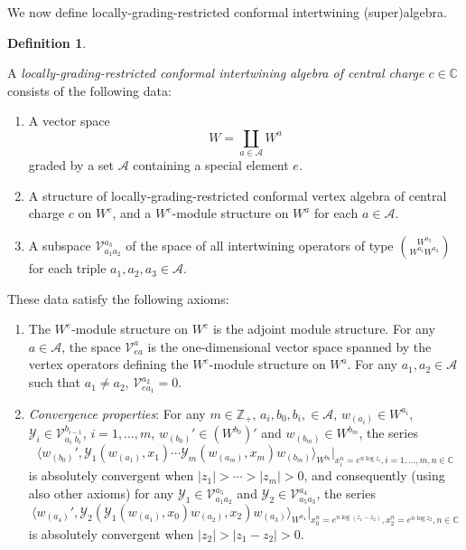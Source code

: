 \documentclass{amsproc}
\theoremstyle{definition}
\newtheorem{defn}[thm]{Definition}
\theoremstyle{remark}
\numberwithin{equation}{section}
\begin{document}
We now define locally-grading-restricted conformal
intertwining (super)algebra.


\begin{defn}\label{ioa}
{\rm A {\it locally-grading-restricted conformal
intertwining algebra of central charge 
$c\in \mathbb{C}$} consists of the following data:

\begin{enumerate}

\item A vector space
$$W=\coprod_{a\in
\mathcal{A}}W^{a}$$
graded
by a set $\mathcal{A}$
containing a special element $e$.

\item A structure of locally-grading-restricted conformal vertex algebra
 of central charge $c$ 
on $W^{e}$, and a $W^{e}$-module 
structure on $W^{a}$ for 
each $a\in \mathcal{A}$.

\item A subspace $\mathcal{V}_{a_{1}a_{2}}^{a_{3}}$ of 
the space of all intertwining operators of type 
$\binom{W^{a_{3}}}{W^{a_{1}}W^{a_{2}}}$ for  each triple
$a_{1}, a_{2}, a_{3}\in \mathcal{A}$.


\end{enumerate}

\noindent These data satisfy the
following axioms:

\begin{enumerate}


\item The $W^{e}$-module structure on $W^{e}$ is the adjoint module
structure. For any $a\in \mathcal{A}$, the space $\mathcal{V}_{ea}^{a}$ is the
one-dimensional vector space spanned by the vertex operators defining the
$W^{e}$-module structure on $W^{a}$.
For any $a_{1}, a_{2}\in \mathcal{A}$ such that
$a_{1}\ne a_{2}$, $\mathcal{V}_{ea_{1}}^{a_{2}}=0$. 





\item {\it Convergence properties}: For any $m\in \mathbb{Z}_{+}$,
$a_{i}, b_{0}, b_{i}, \in \mathcal{A}$, $w_{(a_{i})}
\in W^{a_{i}}$, $\mathcal{Y}_{i}\in \mathcal{
V}_{a_{i}\;b_{i}}^{b_{i-1}}$, $i=1, \dots, m$, $w_{(b_{0})}'
\in (W^{b_{0}})'$ and 
$w_{(b_{m})}\in W^{b_{m}}$, the series
\begin{equation}\label{conv-pr}
\langle w_{(b_{0})}', \mathcal{Y}_{1}(w_{(a_{1})}, x_{1})
\cdots\mathcal{Y}_{m}(w_{(a_{m})},
x_{m})w_{(b_{m})}\rangle_{W^{b_{0}}}|_{x^{n}_{i}=e^{n\log z_{i}},
i=1, \dots, m, n\in \mathbb{C}}
\end{equation}
is absolutely convergent when $|z_{1}|>\cdots >|z_{m}|>0$, and 
consequently (using also other axioms) for 
any $\mathcal{Y}_{1}\in \mathcal{
V}_{a_{1}a_{2}}^{a_{5}}$ and $\mathcal{Y}_{2}\in \mathcal{
V}_{a_{5}a_{3}}^{a_{4}}$, the series
\begin{equation}\label{conv-it}
\langle w_{(a_{4})}', \mathcal{Y}_{2}(\mathcal{Y}_{1}(w_{(a_{1})}, 
x_{0})w_{(a_{2})},
x_{2})w_{(a_{3})}\rangle_{W^{a_{4}}}
|_{x^{n}_{0}=e^{n\log (z_{1}-z_{2})},
x^{n}_{2}=e^{n\log z_{2}}, n\in \mathbb{C}}
\end{equation}
is absolutely convergent when
$|z_{2}|>|z_{1}-z_{2}|>0$.


\end{enumerate}}
\end{defn}
\end{document}
